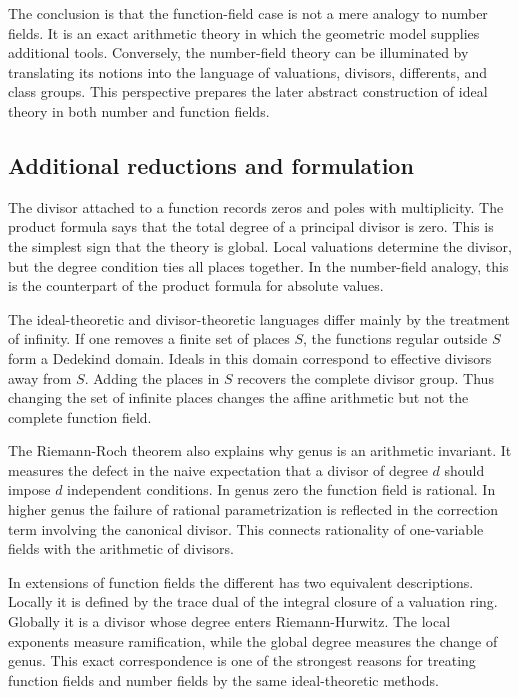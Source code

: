 \documentclass[11pt]{article}
\begin{document}
The conclusion is that the function-field case is not a mere analogy to number fields. It is an
exact arithmetic theory in which the geometric model supplies additional tools. Conversely, the
number-field theory can be illuminated by translating its notions into the language of valuations,
divisors, differents, and class groups. This perspective prepares the later abstract construction of
ideal theory in both number and function fields.


\subsection{Additional reductions and formulation}

The divisor attached to a function records zeros and poles with multiplicity. The product formula
says that the total degree of a principal divisor is zero. This is the simplest sign that the theory
is global. Local valuations determine the divisor, but the degree condition ties all places
together. In the number-field analogy, this is the counterpart of the product formula for absolute
values.

The ideal-theoretic and divisor-theoretic languages differ mainly by the treatment of infinity. If
one removes a finite set of places \(S\), the functions regular outside \(S\) form a Dedekind
domain. Ideals in this domain correspond to effective divisors away from \(S\). Adding the places in
\(S\) recovers the complete divisor group. Thus changing the set of infinite places changes the
affine arithmetic but not the complete function field.

The Riemann-Roch theorem also explains why genus is an arithmetic invariant. It measures the defect
in the naive expectation that a divisor of degree \(d\) should impose \(d\) independent conditions.
In genus zero the function field is rational. In higher genus the failure of rational
parametrization is reflected in the correction term involving the canonical divisor. This connects
rationality of one-variable fields with the arithmetic of divisors.

In extensions of function fields the different has two equivalent descriptions. Locally it is
defined by the trace dual of the integral closure of a valuation ring. Globally it is a divisor
whose degree enters Riemann-Hurwitz. The local exponents measure ramification, while the global
degree measures the change of genus. This exact correspondence is one of the strongest reasons for
treating function fields and number fields by the same ideal-theoretic methods.
\end{document}
